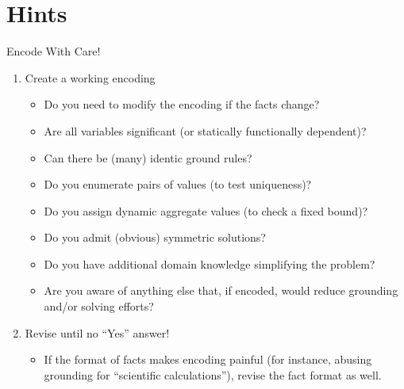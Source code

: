 \section{Hints}
\begin{frame}{Encode With Care!}
  \begin{enumerate}
  \item Create a \alert<1>{working} encoding
    \begin{itemize}
    \item<2->[Q1:] Do you need to modify the encoding if the facts change?
    \item<2->[Q2:] Are all variables significant (or statically functionally dependent)?
    \item<2->[Q3:] Can there be (many) identic ground rules?
    \item<2->[Q4:] Do you enumerate pairs of values (to test uniqueness)?
    \item<2->[Q5:] Do you assign dynamic aggregate values (to check a fixed bound)?
    \item<2->[Q6:] Do you admit (obvious) symmetric solutions?
    \item<3->[Q7:] Do you have additional domain knowledge simplifying the problem?
    \item<4->[Q8:] Are you aware of anything else that, if encoded,
                   would reduce grounding and/or solving efforts?
    \end{itemize}
  \item<1-> \alert<5>{Revise until no ``Yes'' answer!}
    \begin{itemize}
    \item<6-> \alert<6>{If the format of facts makes encoding painful
                        (for instance,
                        abusing grounding for ``scientific calculations''),
                        revise the fact format as well.}
    \end{itemize}
  \end{enumerate}
\end{frame}
